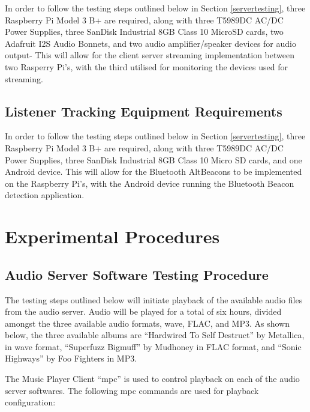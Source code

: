 \documentclass[11pt,a4paper,headinclude=false,footinclude=false]{scrreprt}
\begin{document}
In order to follow the testing steps outlined below in Section
\ref{servertesting}, three Raspberry Pi Model 3 B+ are required, along
with three T5989DC AC/DC Power Supplies, three SanDisk Industrial 8GB
Class 10 MicroSD cards, two Adafruit I2S Audio Bonnets, and two audio
amplifier/speaker devices for audio output- This will allow for the
client server streaming implementation between two Rasperry Pi's, with
the third utilised for monitoring the devices used for streaming.

\subsection{Listener Tracking Equipment
Requirements}\label{listener-tracking-equipment-requirements}

In order to follow the testing steps outlined below in Section
\ref{servertesting}, three Raspberry Pi Model 3 B+ are required, along
with three T5989DC AC/DC Power Supplies, three SanDisk Industrial 8GB
Class 10 Micro SD cards, and one Android device. This will allow for the
Bluetooth AltBeacons to be implemented on the Raspberry Pi's, with the
Android device running the Bluetooth Beacon detection application.

\section{\texorpdfstring{Experimental Procedures
\label{expprocedure}}{Experimental Procedures }}\label{experimental-procedures}

\subsection{\texorpdfstring{Audio Server Software Testing Procedure
\label{servertesting}}{Audio Server Software Testing Procedure }}\label{audio-server-software-testing-procedure}

The testing steps outlined below will initiate playback of the available
audio files from the audio server. Audio will be played for a total of
six hours, divided amongst the three available audio formats, wave,
FLAC, and MP3. As shown below, the three available albums are
``Hardwired To Self Destruct'' by Metallica, in wave format, ``Superfuzz
Bigmuff'' by Mudhoney in FLAC format, and ``Sonic Highways'' by Foo
Fighters in MP3.

The Music Player Client ``mpc'' is used to control playback on each of
the audio server softwares. The following mpc commands are used for
playback configuration:
\end{document}
